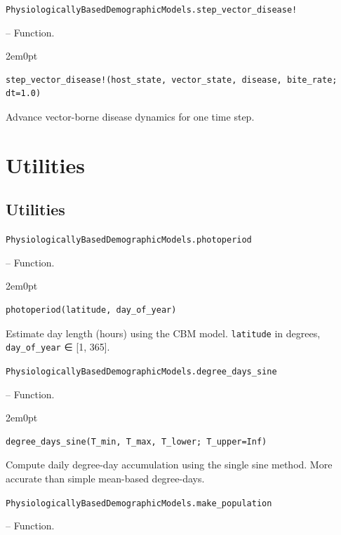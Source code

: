 \hypertarget{3527959153632372255}{\texttt{PhysiologicallyBasedDemographicModels.step\_vector\_disease!}}  -- {Function.}

\begin{adjustwidth}{2em}{0pt}


\begin{verbatim}
step_vector_disease!(host_state, vector_state, disease, bite_rate; dt=1.0)
\end{verbatim}

Advance vector-borne disease dynamics for one time step.



\end{adjustwidth}

\chapter{Utilities}


\section{Utilities}



\label{16100168999309645049}{}

\hypertarget{12420470572973415376}{\texttt{PhysiologicallyBasedDemographicModels.photoperiod}}  -- {Function.}

\begin{adjustwidth}{2em}{0pt}


\begin{verbatim}
photoperiod(latitude, day_of_year)
\end{verbatim}

Estimate day length (hours) using the CBM model. \texttt{latitude} in degrees, \texttt{day\_of\_year} ∈ [1, 365].



\end{adjustwidth}
\hypertarget{10238115126565819077}{\texttt{PhysiologicallyBasedDemographicModels.degree\_days\_sine}}  -- {Function.}

\begin{adjustwidth}{2em}{0pt}


\begin{verbatim}
degree_days_sine(T_min, T_max, T_lower; T_upper=Inf)
\end{verbatim}

Compute daily degree-day accumulation using the single sine method. More accurate than simple mean-based degree-days.



\end{adjustwidth}
\hypertarget{17592084911416240054}{\texttt{PhysiologicallyBasedDemographicModels.make\_population}}  -- {Function.}

